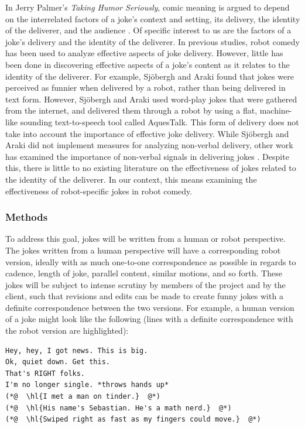 In Jerry Palmer's \textit{Taking Humor Seriously}, comic meaning is argued to depend on the interrelated factors of a joke's context and setting, its delivery, the identity of the deliverer, and the audience \cite{Palmer:1993}.
Of specific interest to us are the factors of a joke's delivery and the identity of the deliverer.
In previous studies, robot comedy has been used to analyze effective aspects of joke delivery.
However, little has been done in discovering effective aspects of a joke's content as it relates to the identity of the deliverer.
For example, Sj\"{o}bergh and Araki \cite{RobotsMakeThings:2008} found that jokes were perceived as funnier when delivered by a robot, rather than being delivered in text form.
However, Sj\"{o}bergh and Araki used word-play jokes that were gathered from the internet, and delivered them through a robot by using a flat, machine-like sounding text-to-speech tool called AquesTalk. This form of delivery does not take into account the importance of effective joke delivery. While Sj\"{o}bergh and Araki did not implement measures for analyzing non-verbal delivery, other work has examined the importance of non-verbal signals in delivering jokes \cite{KatevasRobot:2014} \cite{KnightEightLessons:2011}.
Despite this, there is little to no existing literature on the effectiveness of jokes related to the identity of the deliverer.
In our context, this means examining the effectiveness of robot-specific jokes in robot comedy.

\subsubsection{Methods}
To address this goal, jokes will be written from a human or robot perspective. The jokes written from a human
perspective will have a corresponding robot version, ideally with as much one-to-one correspondence as possible in
regards to cadence, length of joke, parallel content, similar motions, and so forth. These jokes will be subject to intense
scrutiny by members of the project and by the client, such that revisions and edits can be made to create funny jokes
with a definite correspondence between the two versions. For example, a human version of a joke might look like the
following (lines with a definite correspondence with the robot version are highlighted):

\begin{lstlisting}
Hey, hey, I got news. This is big.
Ok, quiet down. Get this.
That's RIGHT folks.
I'm no longer single. *throws hands up*
(*@  \hl{I met a man on tinder.}  @*)
(*@  \hl{His name's Sebastian. He's a math nerd.}  @*)
(*@  \hl{Swiped right as fast as my fingers could move.}  @*)
\end{lstlisting}

